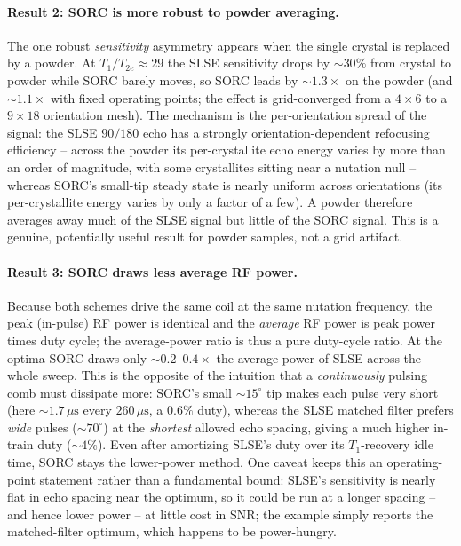 \documentclass[11pt,oneside]{report}
\begin{document}
\paragraph{Result 2: SORC is more robust to powder averaging.}
The one robust \emph{sensitivity} asymmetry appears when the single crystal is
replaced by a powder. At \(T_1/T_{2e}\approx 29\) the SLSE sensitivity drops by
\(\sim 30\%\) from crystal to powder while SORC barely moves, so SORC leads by
\(\sim 1.3\times\) on the powder (and \(\sim 1.1\times\) with fixed operating
points; the effect is grid-converged from a \(4\times 6\) to a \(9\times 18\)
orientation mesh). The mechanism is the per-orientation spread of the signal: the
SLSE \(90/180\) echo has a strongly orientation-dependent refocusing efficiency --
across the powder its per-crystallite echo energy varies by more than an order of
magnitude, with some crystallites sitting near a nutation null -- whereas SORC's
small-tip steady state is nearly uniform across orientations (its per-crystallite
energy varies by only a factor of a few). A powder therefore averages away much of
the SLSE signal but little of the SORC signal. This is a genuine, potentially
useful result for powder samples, not a grid artifact.

\paragraph{Result 3: SORC draws less average RF power.}
Because both schemes drive the same coil at the same nutation frequency, the peak
(in-pulse) RF power is identical and the \emph{average} RF power is peak power
times duty cycle; the average-power ratio is thus a pure duty-cycle ratio. At the
optima SORC draws only \(\sim 0.2\text{--}0.4\times\) the average power of SLSE
across the whole sweep. This is the opposite of the intuition that a
\emph{continuously} pulsing comb must dissipate more: SORC's small \(\sim
15^\circ\) tip makes each pulse very short (here \(\sim 1.7\,\mu\mathrm{s}\) every
\(260\,\mu\mathrm{s}\), a \(0.6\%\) duty), whereas the SLSE matched filter prefers
\emph{wide} pulses (\(\sim 70^\circ\)) at the \emph{shortest} allowed echo spacing,
giving a much higher in-train duty (\(\sim 4\%\)). Even after amortizing SLSE's
duty over its \(T_1\)-recovery idle time, SORC stays the lower-power method. One
caveat keeps this an operating-point statement rather than a fundamental bound:
SLSE's sensitivity is nearly flat in echo spacing near the optimum, so it could be
run at a longer spacing -- and hence lower power -- at little cost in SNR; the
example simply reports the matched-filter optimum, which happens to be
power-hungry.
\end{document}
